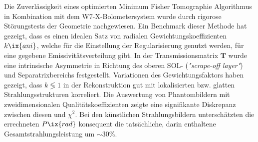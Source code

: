         Die Zuverlässigkeit eines optimierten Minimum Fisher Tomographie Algorithmus in Kombination mit dem W7-X-Bolometersystem wurde durch rigorose Störungstests der Geometrie nachgewiesen. Ein Benchmark dieser Methode hat gezeigt, dass es einen idealen Satz von radialen Gewichtungskoeffizienten $k\ix{ani}$, welche für die Einstellung der Regularisierung genutzt werden, für eine gegebene Emissivitätsverteilung gibt. In der Transmissionsmatrix $\mathbf{T}$ wurde eine intrinsische Asymmetrie in Richtung des oberen SOL- (\textit{"scrape-off layer"}) und Separatrixbereichs festgestellt. Variationen des Gewichtungsfaktors haben gezeigt, dass $k\lessgtr1$ in der Rekonstruktion gut mit lokalisierten bzw. glatten Strahlungsstrukturen korreliert. Die Auswertung von Phantombildern mit zweidimensionalen Qualitätskoeffizienten zeigte eine signifikante Diskrepanz zwischen diesen und $\chi^{2}$. Bei den künstlichen Strahlungsbildern unterschätzten die errechneten $P\ix{rad}$ konsequent die tatsächliche, darin enthaltene Gesamtstrahlungsleistung um $\sim30\%$.%
%